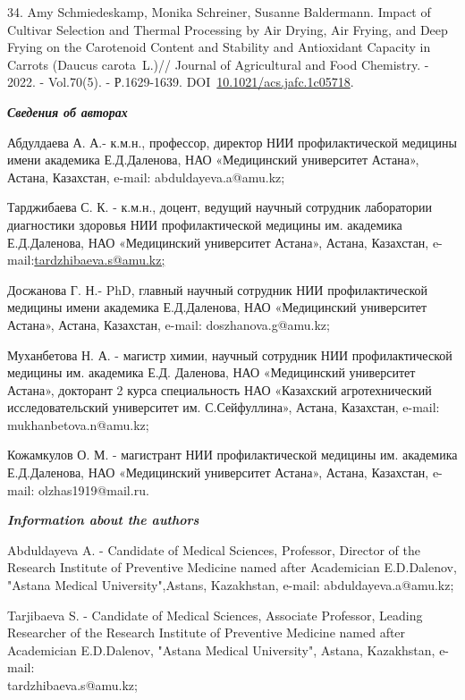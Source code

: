 \begin{refs}
34. Amy Schmiedeskamp, Monika Schreiner, Susanne Baldermann. Impact of
Cultivar Selection and Thermal Processing by Air Drying, Air Frying, and
Deep Frying on the Carotenoid Content and Stability and Antioxidant
Capacity in Carrots (Daucus carota~L.)// Journal of Agricultural and
Food Chemistry. - 2022. - Vol.70(5). - Р.1629-1639.
DOI~\href{https://doi.org/10.1021/acs.jafc.1c05718}{10.1021/acs.jafc.1c05718}.
\end{refs}

\begin{info}
\emph{{\bfseries Сведения об авторах}}

Абдулдаева А. А.- к.м.н., профессор, директор НИИ профилактической
медицины имени академика Е.Д.Даленова, НАО «Медицинский университет
Астана», Астана, Казахстан, e-mail:
abduldayeva.a@amu.kz;

Тарджибаева С. К. - к.м.н., доцент, ведущий научный сотрудник
лаборатории диагностики здоровья НИИ профилактической медицины им.
академика Е.Д.Даленова, НАО «Медицинский университет Астана», Астана,
Казахстан,
e-mail:\href{mailto:tardzhibaeva.s@amu.kz;\%20}{tardzhibaeva.s@amu.kz;}

Досжанова Г. Н.- PhD, главный научный сотрудник НИИ профилактической
медицины имени академика Е.Д.Даленова, НАО «Медицинский университет
Астана», Астана, Казахстан, e-mail:
doszhanova.g@amu.kz;

Муханбетова Н. А. - магистр химии, научный сотрудник НИИ
профилактической медицины им. академика Е.Д. Даленова, НАО «Медицинский
университет Астана», докторант 2 курса специальность НАО «Казахский
агротехнический исследовательский университет им. С.Сейфуллина», Астана,
Казахстан, e-mail: mukhanbetova.n@amu.kz;

Кожамкулов О. М. - магистрант НИИ профилактической медицины им.
академика Е.Д.Даленова, НАО «Медицинский университет Астана», Астана,
Казахстан, e-mail:
olzhas1919@mail.ru.

\emph{{\bfseries Information about the authors}}

Abduldayeva A. - Candidate of Medical Sciences, Professor, Director of
the Research Institute of Preventive Medicine named after Academician
E.D.Dalenov, "Astana Medical University",Astans, Kazakhstan, e-mail:
abduldayeva.a@amu.kz;

Tarjibaeva S. - Candidate of Medical Sciences, Associate Professor,
Leading Researcher of the Research Institute of Preventive Medicine
named after Academician E.D.Dalenov, "Astana Medical University",
Astana, Kazakhstan, e-mail: \\tardzhibaeva.s@amu.kz;


\end{info}
